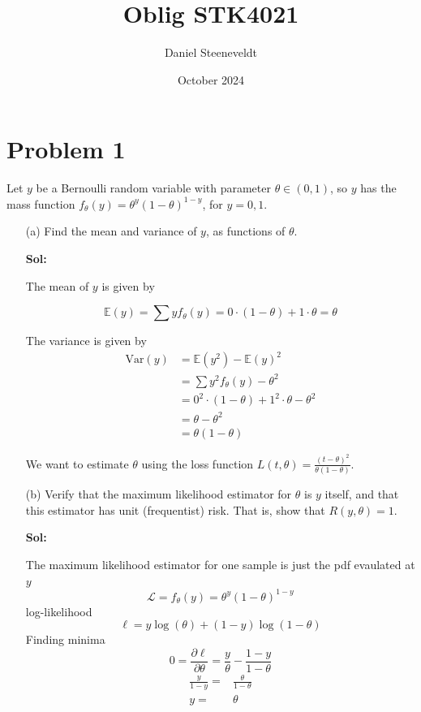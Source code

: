 \documentclass{article}
\title{Oblig STK4021}
\author{Daniel Steeneveldt}
\date{October 2024}
\begin{document}
\maketitle
\section{Problem 1}
Let $y$ be a Bernoulli random variable with parameter $\theta \in (0,1)$, so $y$ has the mass function $f_\theta(y) = \theta^y(1-\theta)^{1-y}$, for $y = 0,1$.
\begin{enumerate}

    \item[(a)] Find the mean and variance of $y$, as functions of $\theta$.
    


    \textbf{Sol:}
    \par
    The mean of $y$ is given by

    \[
    \mathbb{E}(y) = \sum y f_{\theta} (y) = 0 \cdot (1-\theta) + 1 \cdot \theta = \theta
    \]

    The variance is given by
    \begin{align*}
    \text{Var}(y) &= \mathbb{E}(y^2) - \mathbb{E}(y)^2 \\
    &= \sum y^2 f_{\theta} (y) - \theta^2 \\
    &= 0^2 \cdot (1-\theta) + 1^2 \cdot \theta - \theta^2 \\
    &= \theta - \theta^2 \\
    &= \theta(1- \theta)
    \end{align*}



    We want to estimate $\theta$ using the loss function $L(t, \theta) = \frac{(t-\theta)^2}{\theta(1-\theta)}$.
    
    \item[(b)] Verify that the maximum likelihood estimator for $\theta$ is $y$ itself, and that this estimator has unit (frequentist) risk. That is, show that $R(y, \theta) = 1$.

    \textbf{Sol:}
    \par
    The maximum likelihood estimator for one sample is just the pdf evaulated at $y$
    \[
    \mathcal{L} = f_{\theta}(y) = \theta^y (1-\theta)^{1-y}
    \]
    log-likelihood
    \[
    \ell = y \log(\theta) + (1-y) \log(1-\theta)
    \]
    Finding minima
    \[
        0 = \frac{\partial \ell}{\partial \theta} = \frac{y}{\theta} - \frac{1-y}{1-\theta} 
    \]
    \begin{align*}
        \frac{y}{1-y} =& \frac{\theta}{1-\theta}\\
        y =& \theta
    \end{align*}


\end{enumerate}
\end{document}
